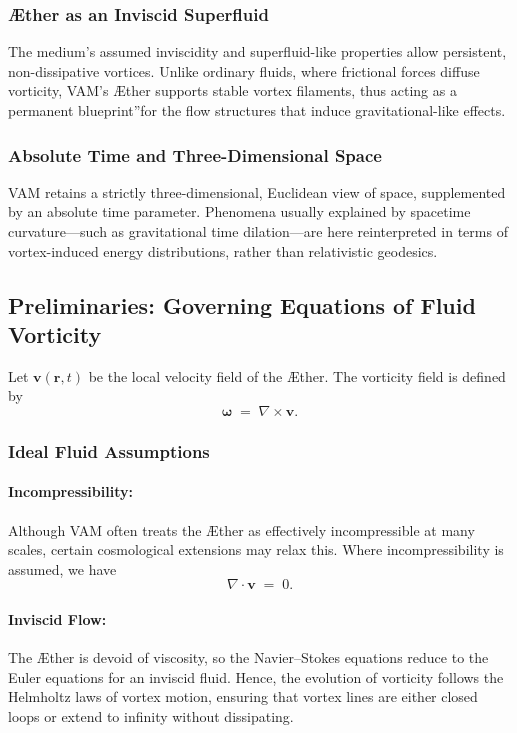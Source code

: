 \documentclass[a4paper,12pt]{article}
\begin{document}
\subsubsection{Æther as an Inviscid Superfluid}
The medium's assumed inviscidity and superfluid-like properties allow persistent, non-dissipative vortices. Unlike ordinary fluids, where frictional forces diffuse vorticity, VAM's Æther supports stable vortex filaments, thus acting as a permanent \grqq blueprint\textquotedblright for the flow structures that induce gravitational-like effects.

\subsubsection{Absolute Time and Three-Dimensional Space}
VAM retains a strictly three-dimensional, Euclidean view of space, supplemented by an absolute time parameter. Phenomena usually explained by spacetime curvature—such as gravitational time dilation—are here reinterpreted in terms of vortex-induced energy distributions, rather than relativistic geodesics.

\subsection{Preliminaries: Governing Equations of Fluid Vorticity}
Let \(\mathbf{v}(\mathbf{r},t)\) be the local velocity field of the Æther. The vorticity field is defined by
\[
    \boldsymbol{\omega} \;=\; \nabla \times \mathbf{v}.
\]

\subsubsection{Ideal Fluid Assumptions}
\paragraph{Incompressibility:}
Although VAM often treats the Æther as effectively incompressible at many scales, certain cosmological extensions may relax this. Where incompressibility is assumed, we have
\[
    \nabla \cdot \mathbf{v} \;=\; 0.
\]

\paragraph{Inviscid Flow:}
The Æther is devoid of viscosity, so the Navier–Stokes equations reduce to the Euler equations for an inviscid fluid. Hence, the evolution of vorticity follows the Helmholtz laws of vortex motion, ensuring that vortex lines are either closed loops or extend to infinity without dissipating.
\end{document}
